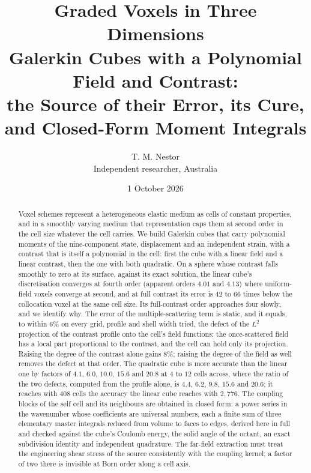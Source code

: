 \documentclass[11pt,a4paper]{article}
\title{\bfseries Graded Voxels in Three Dimensions\\[4pt]
\large Galerkin Cubes with a Polynomial Field and Contrast:\\
the Source of their Error, its Cure, and Closed-Form Moment Integrals}
\author{T. M. Nestor\\[2pt]\small Independent researcher, Australia}
\date{1 October 2026}
\begin{document}
\maketitle

\begin{abstract}
\noindent
Voxel schemes represent a heterogeneous elastic medium as cells of constant properties, and in a smoothly
varying medium that representation caps them at second order in the cell size whatever the cell carries.
We build Galerkin cubes that carry polynomial moments of the nine-component state, displacement and an
independent strain, with a contrast that is itself a polynomial in the cell: first the cube with a
linear field and a linear contrast, then the one with both quadratic. On a sphere whose contrast falls
smoothly to zero at its surface, against its exact solution, the linear cube's discretisation converges at
fourth order (apparent orders $4.01$ and $4.13$) where uniform-field voxels converge at second, and at
full contrast its error is $42$ to $66$ times below the collocation voxel at the same cell size. Its
full-contrast order approaches four slowly, and we identify why. The error of the multiple-scattering term
is static, and it equals, to within $6\%$ on every grid, profile and shell width tried, the defect of the
$L^2$ projection of the contrast profile onto the cell's field functions: the once-scattered field has a
local part proportional to the contrast, and the cell can hold only its projection. Raising the degree of
the contrast alone gains $8\%$; raising the degree of the field as well removes the defect at that order.
The quadratic cube is more accurate than the linear one by factors of $4.1$, $6.0$, $10.0$, $15.6$ and
$20.8$ at $4$ to $12$ cells across, where the ratio of the two defects, computed from the profile alone,
is $4.4$, $6.2$, $9.8$, $15.6$ and $20.6$; it reaches with $408$ cells the accuracy the linear cube
reaches with $2{,}776$. The coupling blocks of the self cell and its neighbours are obtained in closed
form: a power series in the wavenumber whose coefficients are universal numbers, each a finite sum of
three elementary master integrals reduced from volume to faces to edges, derived here in full and checked
against the cube's Coulomb energy, the solid angle of the octant, an exact subdivision identity and
independent quadrature. The far-field extraction must treat the engineering shear stress of the source
consistently with the coupling kernel; a factor of two there is invisible at Born order along a cell axis.
\end{abstract}
\end{document}
